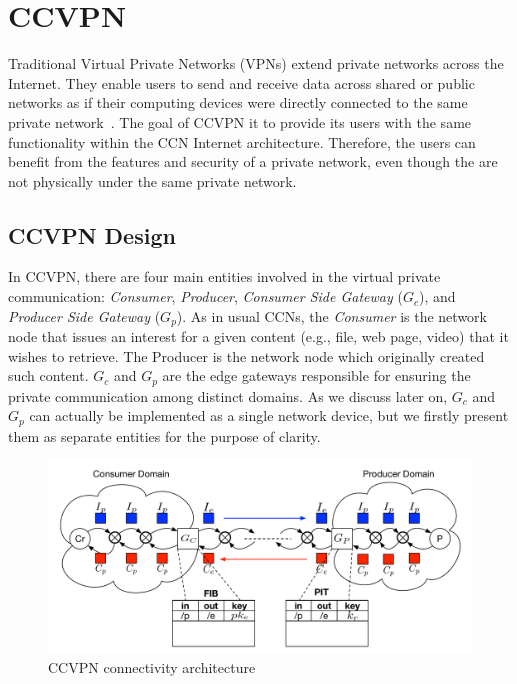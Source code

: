 \section{CCVPN}\label{metho}

Traditional Virtual Private Networks (VPNs) extend private networks across the Internet. They enable users to send and receive data across shared or public networks as if their computing devices were directly connected to the same private network~\cite{khanvilkar2004virtual}. The goal of CCVPN it to provide its users with the same functionality within the CCN Internet architecture. Therefore, the users can benefit from the features and security of a private network, even though the are not physically under the same private network.

\subsection{CCVPN Design}

In CCVPN, there are four main entities involved in the virtual private communication: \textit{Consumer}, \textit{Producer}, \textit{Consumer Side Gateway} ($G_c$), and \textit{Producer Side Gateway} ($G_p$). As in usual CCNs, the \textit{Consumer} is the network node that issues an interest for a given content (e.g., file, web page, video) that it wishes to retrieve. The Producer is the network node which originally created such content. $G_c$ and $G_p$ are the edge gateways responsible for ensuring the private communication among distinct domains. As we discuss later on, $G_c$ and $G_p$ can actually be implemented as a single network device, but we firstly present them as separate entities for the purpose of clarity.

\begin{figure}[!ht]
\centering
\includegraphics[width=1.9\columnwidth]{images/architecture.pdf}
\caption{CCVPN connectivity architecture}
\label{fig:ccvpn}
\end{figure}

